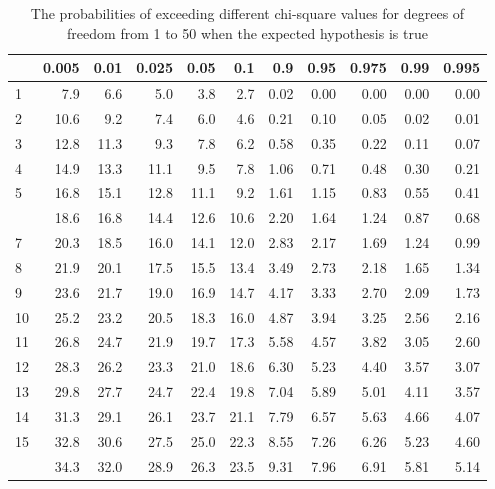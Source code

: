 \documentclass[11pt,ignorenonframetext,aspectratio=169]{beamer}
\begin{document}
\begin{frame}{}
\protect\hypertarget{section-3}{}
\begin{table}

\caption{\label{tab:chi-sqrt-values}The probabilities of exceeding different chi-square values for degrees of freedom from 1 to 50 when the expected hypothesis is true}
\centering
\fontsize{5}{7}\selectfont
\begin{tabular}[t]{lrrrr|>{}rrrrrr}
\toprule
  & 0.005 & 0.01 & 0.025 & 0.05 & 0.1 & 0.9 & 0.95 & 0.975 & 0.99 & 0.995\\
\midrule
\rowcolor{gray!6}  1 & 7.9 & 6.6 & 5.0 & 3.8 & 2.7 & 0.02 & 0.00 & 0.00 & 0.00 & 0.00\\
2 & 10.6 & 9.2 & 7.4 & 6.0 & 4.6 & 0.21 & 0.10 & 0.05 & 0.02 & 0.01\\
\rowcolor{gray!6}  3 & 12.8 & 11.3 & 9.3 & 7.8 & 6.2 & 0.58 & 0.35 & 0.22 & 0.11 & 0.07\\
4 & 14.9 & 13.3 & 11.1 & 9.5 & 7.8 & 1.06 & 0.71 & 0.48 & 0.30 & 0.21\\
\rowcolor{gray!6}  5 & 16.8 & 15.1 & 12.8 & 11.1 & 9.2 & 1.61 & 1.15 & 0.83 & 0.55 & 0.41\\
\addlinespace
6 & 18.6 & 16.8 & 14.4 & 12.6 & 10.6 & 2.20 & 1.64 & 1.24 & 0.87 & 0.68\\
\rowcolor{gray!6}  7 & 20.3 & 18.5 & 16.0 & 14.1 & 12.0 & 2.83 & 2.17 & 1.69 & 1.24 & 0.99\\
8 & 21.9 & 20.1 & 17.5 & 15.5 & 13.4 & 3.49 & 2.73 & 2.18 & 1.65 & 1.34\\
\rowcolor{gray!6}  9 & 23.6 & 21.7 & 19.0 & 16.9 & 14.7 & 4.17 & 3.33 & 2.70 & 2.09 & 1.73\\
10 & 25.2 & 23.2 & 20.5 & 18.3 & 16.0 & 4.87 & 3.94 & 3.25 & 2.56 & 2.16\\
\addlinespace
\rowcolor{gray!6}  11 & 26.8 & 24.7 & 21.9 & 19.7 & 17.3 & 5.58 & 4.57 & 3.82 & 3.05 & 2.60\\
12 & 28.3 & 26.2 & 23.3 & 21.0 & 18.6 & 6.30 & 5.23 & 4.40 & 3.57 & 3.07\\
\rowcolor{gray!6}  13 & 29.8 & 27.7 & 24.7 & 22.4 & 19.8 & 7.04 & 5.89 & 5.01 & 4.11 & 3.57\\
14 & 31.3 & 29.1 & 26.1 & 23.7 & 21.1 & 7.79 & 6.57 & 5.63 & 4.66 & 4.07\\
\rowcolor{gray!6}  15 & 32.8 & 30.6 & 27.5 & 25.0 & 22.3 & 8.55 & 7.26 & 6.26 & 5.23 & 4.60\\
\addlinespace
16 & 34.3 & 32.0 & 28.9 & 26.3 & 23.5 & 9.31 & 7.96 & 6.91 & 5.81 & 5.14\\

\end{tabular}
\end{table}
\end{frame}
\end{document}
